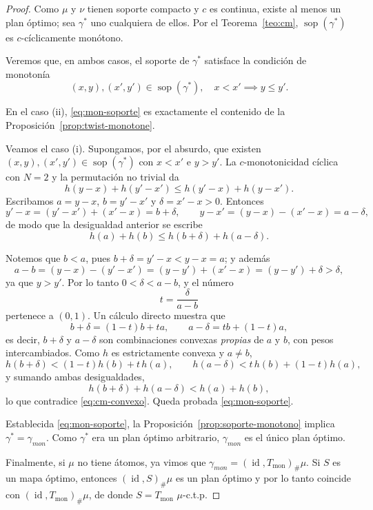 \documentclass[12pt, a4paper]{amsbook}
\newcommand{\id}{\operatorname{id}}
\def\sop{\operatorname {\mathrm{sop}}}
\theoremstyle{remark}
\theoremstyle{definition}
\numberwithin{section}{chapter}
\numberwithin{subsection}{section}
\numberwithin{equation}{section}
\numberwithin{figure}{chapter}
\begin{document}
\begin{proof}
Como $\mu$ y $\nu$ tienen soporte compacto y $c$ es continua, existe al menos un
plan óptimo; sea $\gamma^*$ uno cualquiera de ellos. Por el Teorema~\ref{teo:cm},
$\sop(\gamma^*)$ es $c$-cíclicamente monótono.

Veremos que, en ambos casos, el soporte de $\gamma^*$ satisface la condición de
monotonía
\begin{equation}\label{eq:mon-soporte}
(x,y),(x',y')\in\sop(\gamma^*),\quad x<x'
\implies
y\le y'.
\end{equation}

En el caso (ii), \eqref{eq:mon-soporte} es exactamente el contenido de la
Proposición~\ref{prop:twist-monotone}.

Veamos el caso (i). Supongamos, por el absurdo, que existen
$(x,y),(x',y')\in\sop(\gamma^*)$ con $x<x'$ e $y>y'$. La $c$-monotonicidad cíclica
con $N=2$ y la permutación no trivial da
\[
h(y-x)+h(y'-x')\le h(y'-x)+h(y-x').
\]
Escribamos $a=y-x$, $b=y'-x'$ y $\delta=x'-x>0$. Entonces
\[
y'-x=(y'-x')+(x'-x)=b+\delta,
\qquad
y-x'=(y-x)-(x'-x)=a-\delta,
\]
de modo que la desigualdad anterior se escribe
\begin{equation}\label{eq:cm-convexo}
h(a)+h(b)\le h(b+\delta)+h(a-\delta).
\end{equation}

Notemos que $b<a$, pues $b+\delta=y'-x<y-x=a$; y además
\[
a-b=(y-x)-(y'-x')=(y-y')+(x'-x)=(y-y')+\delta>\delta,
\]
ya que $y>y'$. Por lo tanto $0<\delta<a-b$, y el número
\[
t=\frac{\delta}{a-b}
\]
pertenece a $(0,1)$. Un cálculo directo muestra que
\[
b+\delta=(1-t)b+ta,
\qquad
a-\delta=tb+(1-t)a,
\]
es decir, $b+\delta$ y $a-\delta$ son combinaciones convexas \emph{propias} de $a$ y
$b$, con pesos intercambiados. Como $h$ es estrictamente convexa y $a\neq b$,
\[
h(b+\delta)<(1-t)h(b)+t\,h(a),
\qquad
h(a-\delta)<t\,h(b)+(1-t)h(a),
\]
y sumando ambas desigualdades,
\[
h(b+\delta)+h(a-\delta)<h(a)+h(b),
\]
lo que contradice \eqref{eq:cm-convexo}. Queda probada \eqref{eq:mon-soporte}.

Establecida \eqref{eq:mon-soporte}, la Proposición~\ref{prop:soporte-monotono}
implica $\gamma^*=\gamma_{mon}$. Como $\gamma^*$ era un plan óptimo arbitrario,
$\gamma_{mon}$ es el único plan óptimo.

Finalmente, si $\mu$ no tiene átomos, ya vimos que
$\gamma_{mon}=(\id,T_\text{mon})_\#\mu$. Si $S$ es un mapa óptimo, entonces
$(\id,S)_\#\mu$ es un plan óptimo y por lo tanto coincide con
$(\id,T_\text{mon})_\#\mu$, de donde $S=T_\text{mon}$ $\mu$-c.t.p.
\end{proof}
\end{document}
